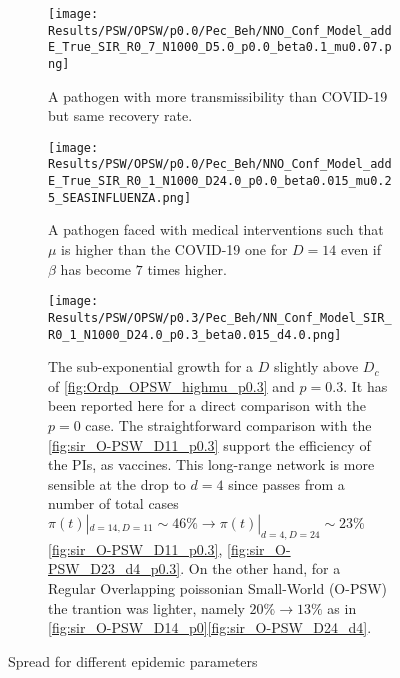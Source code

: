 \documentclass[a4paper,10pt,twoside]{book} %
\theoremstyle{definition}
\begin{document}
\begin{figure}[p]
	\centering
	\begin{subfigure}{\linewidth}
		\centering
		\texttt{[image: Results/PSW/OPSW/p0.0/Pec\_Beh/NNO\_Conf\_Model\_addE\_True\_SIR\_R0\_7\_N1000\_D5.0\_p0.0\_beta0.1\_mu0.07.png]}
		\caption{A pathogen with more transmissibility than COVID-19 but same recovery rate.}
		\label{fig:sir_O-PSW_D5_d14_b0.1}
	\end{subfigure}
	\vfill
	\begin{subfigure}[t]{\linewidth}
		\centering
		\texttt{[image: Results/PSW/OPSW/p0.0/Pec\_Beh/NNO\_Conf\_Model\_addE\_True\_SIR\_R0\_1\_N1000\_D24.0\_p0.0\_beta0.015\_mu0.25\_SEASINFLUENZA.png]}
		\caption{A pathogen faced with medical interventions such that $\mu$ is higher than the COVID-19 one for $ D = 14$  even if $ \beta$ has become $ 7$ times higher.}
		\label{fig:sir_O-PSW_D23_d4_p0.3}
	\end{subfigure}
	\vfill
	\begin{subfigure}{\linewidth}
		\centering
		\texttt{[image: Results/PSW/OPSW/p0.3/Pec\_Beh/NN\_Conf\_Model\_SIR\_R0\_1\_N1000\_D24.0\_p0.3\_beta0.015\_d4.0.png]}
		\caption{The sub-exponential growth for a $D$ slightly above $D_c$ of \autoref{fig:Ordp_OPSW_highmu_p0.3} and $p = 0.3.$ It has been reported here for a direct comparison with the $p = 0$ case. The straightforward comparison with the \autoref{fig:sir_O-PSW_D11_p0.3} support the efficiency of the PIs, as vaccines. This long-range network is more sensible at the drop to $ d = 4$ since passes from a number of total cases $\pi(t)|_{d = 14, D = 11} \sim 46\% \to \pi(t)|_{d = 4, D =24} \sim 23\%$ \autoref{fig:sir_O-PSW_D11_p0.3}, \autoref{fig:sir_O-PSW_D23_d4_p0.3}. On the other hand, for a Regular Overlapping poissonian Small-World (O-PSW) the trantion was lighter, namely $ 20\% \to 13\%$ as in \autoref{fig:sir_O-PSW_D14_p0}\autoref{fig:sir_O-PSW_D24_d4}.}
		\label{fig:sir_O-PSW_D24_d4}
	\end{subfigure}
	\caption{Spread for different epidemic parameters}
	\label{fig:OPSW_COVID_p0.3}
\end{figure}

\clearpage
\end{document}
